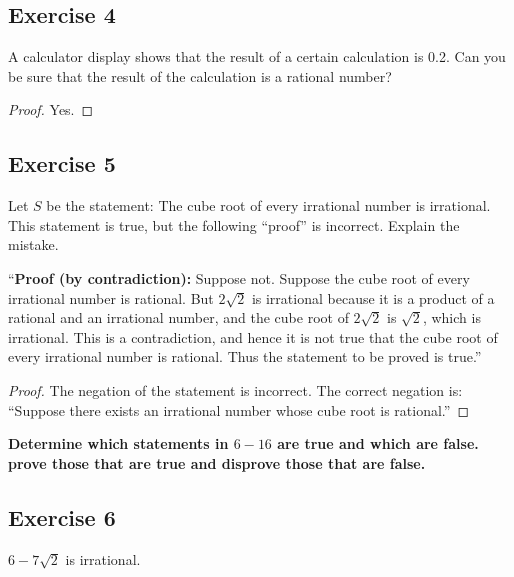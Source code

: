 \documentclass[14pt]{extarticle}
\newcommand{\cy}{\color{cyan}}
\begin{document}
\subsection{Exercise 4}
A calculator display shows that the result of a certain calculation is 0.2. Can you be sure that the result of the calculation is a rational number?

\begin{proof}
    Yes.
\end{proof}

\subsection{Exercise 5}
Let $S$ be the statement: The cube root of every irrational number is irrational. This statement is true, but the following “proof” is incorrect. Explain the mistake.

“{\bf Proof (by contradiction):} Suppose not. Suppose the cube root of every irrational number is rational. But $2\sqrt{2}$ is irrational because it is a product of a rational and an irrational number, and the cube root of $2\sqrt{2}$ is $\sqrt{2}$, which is irrational. This is a contradiction, and hence it is not true that the cube root of every irrational number is rational. Thus the statement to be proved is true.”

\begin{proof}
    The negation of the statement is incorrect. The correct negation is: ``Suppose there exists an irrational number whose cube root is rational.''
\end{proof}

{\bf \cy Determine which statements in $6-16$ are true and which are false. prove those that are true and disprove those that are false.}

\subsection{Exercise 6}
$6 - 7\sqrt{2}$ is irrational.
\end{document}
